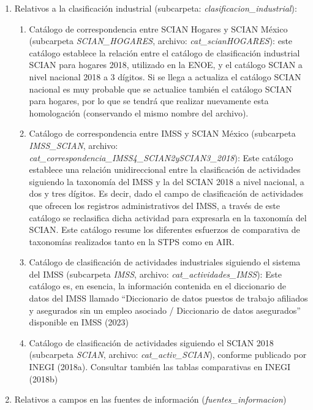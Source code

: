 \documentclass[
]{article}
\begin{document}
\begin{enumerate}
\def\labelenumi{\arabic{enumi}.}
\item
  Relativos a la clasificación industrial (subcarpeta: \emph{clasificacion\_industrial}):

  \begin{enumerate}
  \def\labelenumii{\alph{enumii}.}
  \item
    Catálogo de correspondencia entre SCIAN Hogares y SCIAN México (subcarpeta \emph{SCIAN\_HOGARES}, archivo: \emph{cat\_scianHOGARES}): este catálogo establece la relación entre el catálogo de clasificación industrial SCIAN para hogares 2018, utilizado en la ENOE, y el catálogo SCIAN a nivel nacional 2018 a 3 dígitos. Si se llega a actualiza el catálogo SCIAN nacional es muy probable que se actualice también el catálogo SCIAN para hogares, por lo que se tendrá que realizar nuevamente esta homologación (conservando el mismo nombre del archivo).
  \item
    Catálogo de correspondencia entre IMSS y SCIAN México (subcarpeta \emph{IMSS\_SCIAN}, archivo: \emph{cat\_correspondencia\_IMSS4\_SCIAN2ySCIAN3\_2018}): Este catálogo establece una relación unidireccional entre la clasificación de actividades siguiendo la taxonomía del IMSS y la del SCIAN 2018 a nivel nacional, a dos y tres dígitos. Es decir, dado el campo de clasificación de actividades que ofrecen los registros administrativos del IMSS, a través de este catálogo se reclasifica dicha actividad para expresarla en la taxonomía del SCIAN. Este catálogo resume los diferentes esfuerzos de comparativa de taxonomías realizados tanto en la STPS como en AIR.
  \item
    Catálogo de clasificación de actividades industriales siguiendo el sistema del IMSS (subcarpeta \emph{IMSS}, archivo: \emph{cat\_actividades\_IMSS}): Este catálogo es, en esencia, la información contenida en el diccionario de datos del IMSS llamado ``Diccionario de datos puestos de trabajo afiliados y asegurados sin un empleo asociado / Diccionario de datos asegurados'' disponible en IMSS (2023)
  \item
    Catálogo de clasificación de actividades siguiendo el SCIAN 2018 (subcarpeta \emph{SCIAN}, archivo: \emph{cat\_activ\_SCIAN}), conforme publicado por INEGI (2018a). Consultar también las tablas comparativas en INEGI (2018b)
  \end{enumerate}
\item
  Relativos a campos en las fuentes de información (\emph{fuentes\_informacion})


\end{enumerate}
\end{document}
